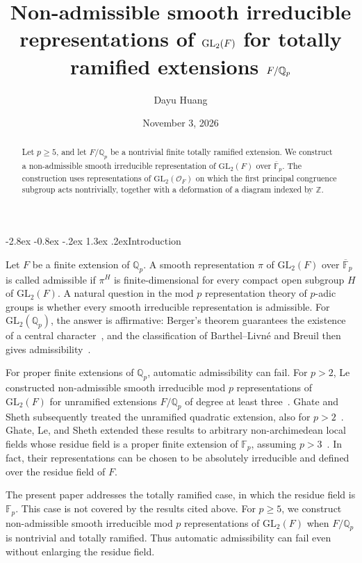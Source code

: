 \documentclass[10pt]{article}
\title{Non-admissible smooth irreducible representations of $\GL_2(F)$ for totally ramified extensions $F/\Qp$}
\author{Dayu Huang}
\date{November 3, 2026}
\makeatletter
\renewcommand\section{\@startsection{section}{1}{\z@}%
  {-2.8ex \@plus -0.8ex \@minus -.2ex}%
  {1.3ex \@plus .2ex}{\normalfont\Large\bfseries}}
\theoremstyle{plain}
\theoremstyle{definition}
\theoremstyle{remark}
\newcommand{\Qp}{\mathbb{Q}_p}
\newcommand{\Fp}{\mathbb{F}_p}
\newcommand{\Fpbar}{\overline{\mathbb{F}}_p}
\newcommand{\GL}{\mathrm{GL}}
\makeatother
\begin{document}
\maketitle

\begin{abstract}
Let $p\geq 5$, and let $F/\Qp$ be a nontrivial finite totally ramified extension. We construct a non-admissible smooth irreducible representation of $\GL_2(F)$ over $\Fpbar$. The construction uses representations of $\GL_2(\mathcal O_F)$ on which the first principal congruence subgroup acts nontrivially, together with a deformation of a diagram indexed by $\mathbb Z$.
\end{abstract}

\section{Introduction}

Let $F$ be a finite extension of $\Qp$. A smooth representation $\pi$ of $\GL_2(F)$ over $\Fpbar$ is called admissible if $\pi^H$ is finite-dimensional for every compact open subgroup $H$ of $\GL_2(F)$. A natural question in the mod $p$ representation theory of $p$-adic groups is whether every smooth irreducible representation is admissible. For $\GL_2(\Qp)$, the answer is affirmative: Berger's theorem guarantees the existence of a central character~\cite{Ber12}, and the classification of Barthel--Livn\'e and Breuil then gives admissibility~\cite{BL94,Bre03}.

For proper finite extensions of $\Qp$, automatic admissibility can fail. For $p>2$, Le constructed non-admissible smooth irreducible mod $p$ representations of $\GL_2(F)$ for unramified extensions $F/\Qp$ of degree at least three~\cite{Le19}. Ghate and Sheth subsequently treated the unramified quadratic extension, also for $p>2$~\cite{GS20}. Ghate, Le, and Sheth extended these results to arbitrary non-archimedean local fields whose residue field is a proper finite extension of $\Fp$, assuming $p>3$~\cite[Theorem~1.1]{GLS23}. In fact, their representations can be chosen to be absolutely irreducible and defined over the residue field of $F$.

The present paper addresses the totally ramified case, in which the residue field is $\Fp$. This case is not covered by the results cited above. For $p\geq 5$, we construct non-admissible smooth irreducible mod $p$ representations of $\GL_2(F)$ when $F/\Qp$ is nontrivial and totally ramified. Thus automatic admissibility can fail even without enlarging the residue field.
\end{document}
